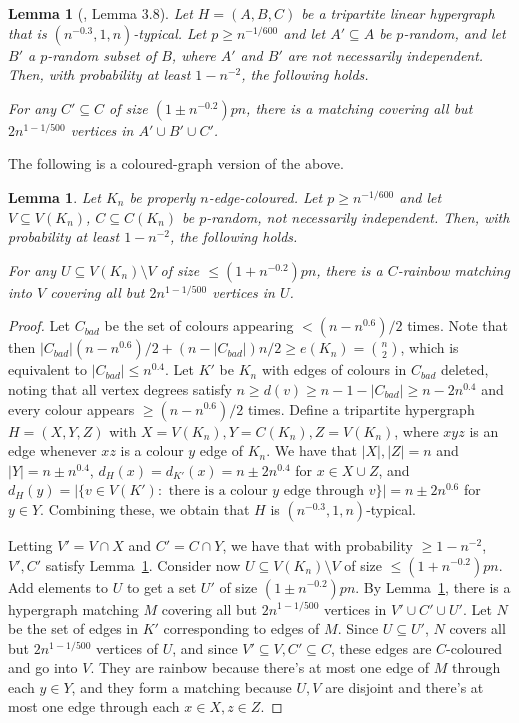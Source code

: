 \documentclass[a4paper,11pt,hidelinks]{amsart}
\newtheorem{lemma}[theorem]{Lemma}
\theoremstyle{definition}
\begin{document}
\begin{lemma}[\cite{muyesser2022random}, Lemma 3.8]\label{Lemma_2_random_1_deterministic}
Let $H=(A,B,C)$ be a tripartite linear hypergraph that is $(n^{-0.3},1,n)$-typical. Let $p\geq n^{-1/600}$ and let $A'\subseteq A$ be $p$-random, and let $B'$ a $p$-random subset of $B$, where $A'$ and $B'$ are not necessarily independent. Then, with probability at least $1-n^{-2}$, the following holds. 
\par For any $C'\subseteq C$ of size $(1\pm n^{-0.2})pn$, there is a matching covering all but $2n^{1-1/500}$ vertices in $A'\cup B'\cup C'$.
\end{lemma}
The following is a coloured-graph version of the above.
\begin{lemma}\label{Lemma_2_random_1_deterministic_graph}
Let $K_n$ be properly $n$-edge-coloured.
Let $p\geq n^{-1/600}$ and let $V\subseteq V(K_n)$, $C\subseteq C(K_n)$ be $p$-random, not necessarily independent. Then, with probability at least $1-n^{-2}$, the following holds. 
\par For any $U\subseteq V(K_n)\setminus V$ of size $\leq (1+ n^{-0.2})pn$, there is a $C$-rainbow matching into $V$ covering all but $2n^{1-1/500}$ vertices in $U$.
\end{lemma}
\begin{proof}
Let $C_{bad}$ be the set of colours appearing $<(n-n^{0.6})/2$ times. Note that then $|C_{bad}|(n-n^{0.6})/2+(n-|C_{bad}|)n/2\geq e(K_n)=\binom n2$, which is equivalent to $|C_{bad}|\leq n^{0.4}$. Let $K'$ be $K_n$ with edges of colours in $C_{bad}$ deleted, noting that all vertex degrees satisfy $n\geq d(v)\geq n-1-|C_{bad}|\geq n-2n^{0.4}$ and every colour appears $\geq (n-n^{0.6})/2$ times.
Define a tripartite hypergraph $H=(X,Y,Z)$ with $X=V(K_n), Y=C(K_n), Z=V(K_n)$, where $xyz$ is an edge whenever $xz$ is a colour $y$ edge of $K_n$. We have that $|X|,|Z|=n$ and $|Y|=n\pm n^{0.4}$,  $d_H(x)=d_{K'}(x)=n\pm 2n^{0.4}$ for $x\in X\cup Z$, and $d_H(y)=|\{v\in V(K'): \text{ there is a colour $y$ edge through $v$}\}|=n\pm 2n^{0.6}$ for $y\in Y$. Combining these, we obtain that $H$ is $(n^{-0.3},1,n)$-typical.

Letting $V'=V\cap X$ and $C'=C\cap Y$, we have that with probability  $\geq 1-n^{-2}$, $V', C'$ satisfy Lemma~\ref{Lemma_2_random_1_deterministic}. Consider now $U\subseteq V(K_n)\setminus V$ of size $\leq (1+ n^{-0.2})pn$. Add elements to $U$ to get a set $U'$ of size $(1\pm n^{-0.2})pn$. By Lemma~\ref{Lemma_2_random_1_deterministic}, there is a hypergraph matching $M$ covering all but $2n^{1-1/500}$ vertices in $V'\cup C'\cup U'$. Let $N$ be the set of edges in $K'$ corresponding to edges of $M$. Since $U\subseteq U'$, $N$ covers all but $2n^{1-1/500}$ vertices of $U$, and since $V'\subseteq V,C'\subseteq C$, these edges are $C$-coloured and go into $V$. They are rainbow because there's at most one edge of $M$ through each $y\in Y$, and they form a matching because $U, V$ are disjoint and there's at most one edge through each $x\in X, z\in Z$.
\end{proof}
\end{document}
